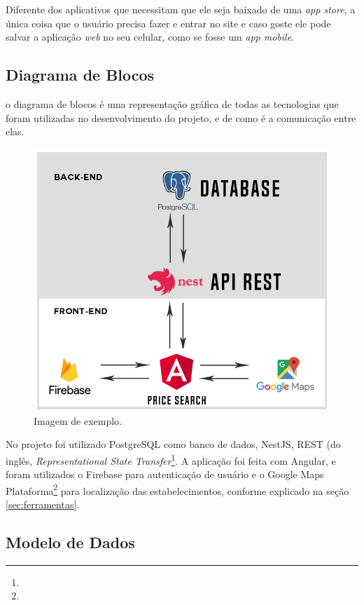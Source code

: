 Diferente dos aplicativos que necessitam que ele seja baixado de uma \textit{app store}, a única coisa que o usuário precisa fazer e entrar no site e caso goste ele pode salvar a aplicação \textit{web} no seu celular, como se fosse um \textit{app mobile}.


\subsection{Diagrama de Blocos}

 o diagrama de blocos é uma representação gráfica de todas as tecnologias que foram utilizadas no desenvolvimento do projeto, e de como é a comunicação entre elas.
 
\begin{figure}[!htb]
\centering
\includegraphics[width=\linewidth]{figuras/diagrama_de_blocos.png}
\caption{Imagem de exemplo.}
\end{figure}
 
 No projeto foi utilizado PostgreSQL como banco de dados, NestJS, REST (do inglês, \textit{Representational State Transfer}\footnote{}. A aplicação foi feita com Angular, e foram utilizados o Firebase para autenticação de usuário e o Google Maps Plataforma\footnote{} para localização das estabelecimentos, conforme explicado na seção \ref{sec:ferramentas}.
 
\subsection{Modelo de Dados}
 
